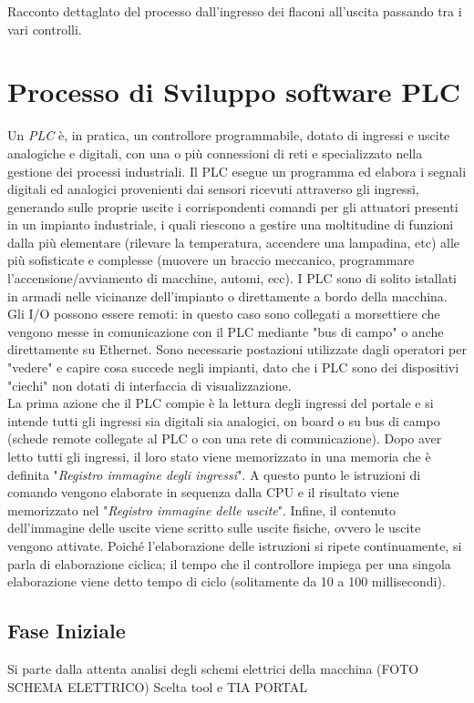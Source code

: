 \documentclass[12pt, a4paper, oneside]{book}
\begin{document}
 
Racconto dettaglato del processo dall'ingresso dei flaconi all'uscita passando tra i vari controlli.
\chapter{Processo di Sviluppo software PLC}
Un \textit{PLC} è, in pratica, un controllore programmabile, dotato di ingressi e uscite analogiche e digitali, con una o più connessioni di reti e specializzato nella gestione dei processi industriali. Il PLC esegue un programma ed elabora i segnali digitali ed analogici provenienti dai sensori ricevuti attraverso gli ingressi, generando sulle proprie uscite i corrispondenti comandi per gli attuatori presenti in un impianto industriale, i quali riescono a gestire una moltitudine di funzioni dalla più elementare (rilevare la temperatura, accendere una lampadina, etc) alle più sofisticate e complesse (muovere un braccio meccanico, programmare l’accensione/avviamento di macchine, automi, ecc). 
I PLC sono di solito istallati in armadi nelle vicinanze dell'impianto o direttamente a bordo della macchina. Gli I/O possono essere remoti: in questo caso sono collegati a morsettiere che vengono messe in comunicazione con il PLC mediante "bus di campo" o anche direttamente su Ethernet. Sono necessarie postazioni utilizzate dagli operatori per "vedere" e capire cosa succede negli impianti, dato che i PLC sono dei dispositivi "ciechi" non dotati di interfaccia di visualizzazione.
\\La prima azione che il PLC compie è la lettura degli ingressi del portale e si intende tutti gli ingressi sia digitali sia analogici, on board o su bus di campo (schede remote collegate al PLC o con una rete di comunicazione). Dopo aver letto tutti gli ingressi, il loro stato viene memorizzato in una memoria che è definita "\textit{Registro immagine degli ingressi}". A questo punto le istruzioni di comando vengono elaborate in sequenza dalla CPU e il risultato viene memorizzato nel "\textit{Registro immagine delle uscite}". Infine, il contenuto dell'immagine delle uscite viene scritto sulle uscite fisiche, ovvero le uscite vengono attivate. Poiché l'elaborazione delle istruzioni si ripete continuamente, si parla di elaborazione ciclica; il tempo che il controllore impiega per una singola elaborazione viene detto tempo di ciclo (solitamente da 10 a 100 millisecondi).
\section{Fase Iniziale }
Si parte dalla attenta analisi degli schemi elettrici della macchina (FOTO SCHEMA ELETTRICO)
Scelta tool e TIA PORTAL
\end{document}
